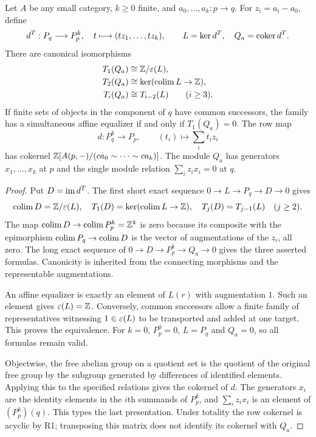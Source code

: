 \begin{theorem}\label{B:lead3}
Let $A$ be any small category, $k\geq0$ finite, and $a_0,\ldots,a_k:p\to q$. For $z_i=a_i-a_0$, define
\[
 d^T:P_q\longrightarrow P_p^k,\quad t\longmapsto(tz_1,\ldots,tz_k),
 \qquad L=\ker d^T,\quad Q_a=\operatorname{coker} d^T.
\]
There are canonical isomorphisms
\begin{align*}
 T_1(Q_a)&\cong\mathbb Z/\varepsilon(L),\\
 T_2(Q_a)&\cong\ker(\operatorname*{colim} L\to\mathbb Z),\\
 T_i(Q_a)&\cong T_{i-2}(L)\qquad(i\geq3).
\end{align*}
If finite sets of objects in the component of $q$ have common successors, the family has a simultaneous affine equalizer if and only if $T_1(Q_a)=0$. The row map
\[
 d:P_q^k\longrightarrow P_p,\qquad(t_i)\longmapsto\sum_i t_i z_i
\]
has cokernel $\mathbb Z[A(p,-)/(ca_0\sim\cdots\sim ca_k)]$. The module $Q_a$ has generators $x_1,\ldots,x_k$ at $p$ and the single module relation $\sum_i z_ix_i=0$ at $q$.
\end{theorem}
\begin{proof}
Put $D=\operatorname{im} d^T$. The first short exact sequence
$0\to L\to P_q\to D\to0$ gives
\[
 \operatorname*{colim} D=\mathbb Z/\varepsilon(L),\quad
 T_1(D)=\ker(\operatorname*{colim} L\to\mathbb Z),\quad
 T_j(D)=T_{j-1}(L)\quad(j\geq2).
\]
The map $\operatorname*{colim} D\to\operatorname*{colim} P_p^k=\mathbb Z^k$ is zero because its composite with the epimorphism $\operatorname*{colim} P_q\to\operatorname*{colim} D$ is the vector of augmentations of the $z_i$, all zero. The long exact sequence of $0\to D\to P_p^k\to Q_a\to0$ gives the three asserted formulas. Canonicity is inherited from the connecting morphisms and the representable augmentations.

An affine equalizer is exactly an element of $L(r)$ with augmentation $1$. Such an element gives $\varepsilon(L)=\mathbb Z$. Conversely, common successors allow a finite family of representatives witnessing $1\in\varepsilon(L)$ to be transported and added at one target. This proves the equivalence. For $k=0$, $P_p^0=0$, $L=P_q$ and $Q_a=0$, so all formulas remain valid.

Objectwise, the free abelian group on a quotient set is the quotient of the original free group by the subgroup generated by differences of identified elements. Applying this to the specified relations gives the cokernel of $d$. The generators $x_i$ are the identity elements in the $i$th summands of $P_p^k$, and $\sum_i z_ix_i$ is an element of $(P_p^k)(q)$. This types the last presentation. Under totality the row cokernel is acyclic by R1; transposing this matrix does not identify its cokernel with $Q_a$.
\end{proof}

